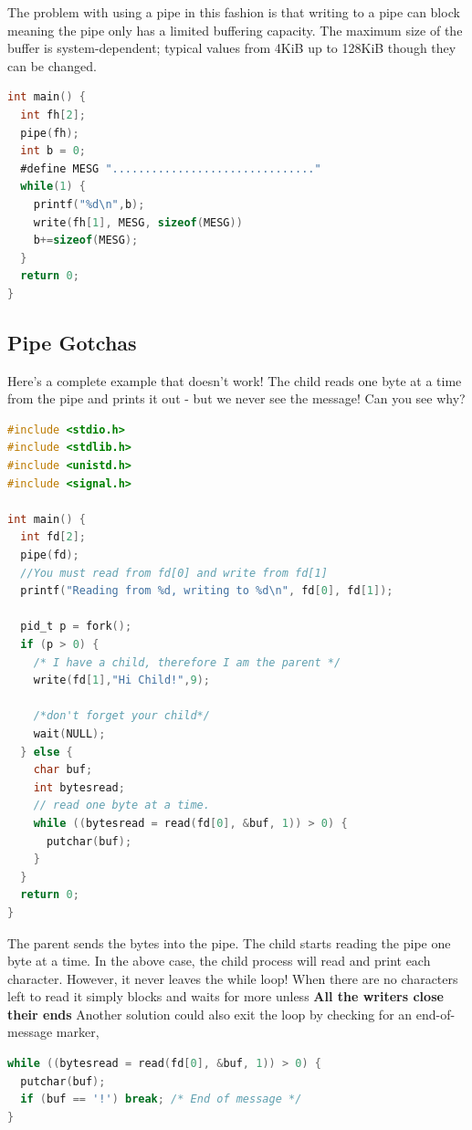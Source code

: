 The problem with using a pipe in this fashion is that writing to a pipe can block meaning the pipe only has a limited buffering capacity.
The maximum size of the buffer is system-dependent; typical values from 4KiB up to 128KiB though they can be changed.

\begin{lstlisting}[language=C]
int main() {
  int fh[2];
  pipe(fh);
  int b = 0;
  #define MESG "..............................."
  while(1) {
    printf("%d\n",b);
    write(fh[1], MESG, sizeof(MESG))
    b+=sizeof(MESG);
  }
  return 0;
}
\end{lstlisting}

\subsection{Pipe Gotchas}

Here's a complete example that doesn't work!
The child reads one byte at a time from the pipe and prints it out - but we never see the message!
Can you see why?

\begin{lstlisting}[language=C]
#include <stdio.h>
#include <stdlib.h>
#include <unistd.h>
#include <signal.h>

int main() {
  int fd[2];
  pipe(fd);
  //You must read from fd[0] and write from fd[1]
  printf("Reading from %d, writing to %d\n", fd[0], fd[1]);

  pid_t p = fork();
  if (p > 0) {
    /* I have a child, therefore I am the parent */
    write(fd[1],"Hi Child!",9);

    /*don't forget your child*/
    wait(NULL);
  } else {
    char buf;
    int bytesread;
    // read one byte at a time.
    while ((bytesread = read(fd[0], &buf, 1)) > 0) {
      putchar(buf);
    }
  }
  return 0;
}
\end{lstlisting}

The parent sends the bytes  into the pipe.
The child starts reading the pipe one byte at a time.
In the above case, the child process will read and print each character.
However, it never leaves the while loop!
When there are no characters left to read it simply blocks and waits for more unless \textbf{All the writers close their ends}
Another solution could also exit the loop by checking for an end-of-message marker,

\begin{lstlisting}[language=C]
while ((bytesread = read(fd[0], &buf, 1)) > 0) {
  putchar(buf);
  if (buf == '!') break; /* End of message */
}
\end{lstlisting}

